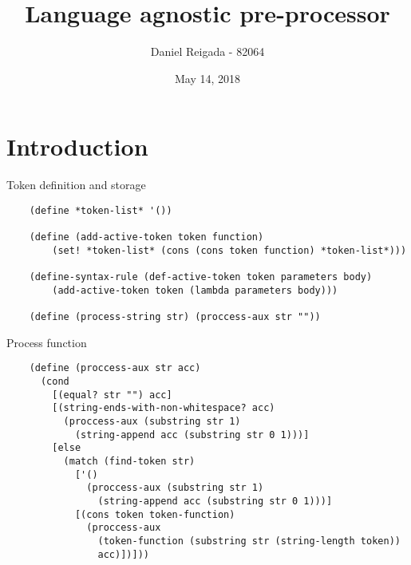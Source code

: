 \documentclass[13pt]{beamer}
\title{Language agnostic pre-processor}
\author{Daniel Reigada - 82064}
\institute{IST - Advanced Programming}
\date{May 14, 2018}
\begin{document}
\begin{frame}
  \titlepage
\end{frame}

\section{Introduction}

\begin{frame}[fragile]{Token definition and storage}
  \begin{verbatim}
    (define *token-list* '())

    (define (add-active-token token function)
        (set! *token-list* (cons (cons token function) *token-list*)))

    (define-syntax-rule (def-active-token token parameters body)
        (add-active-token token (lambda parameters body)))

    (define (process-string str) (proccess-aux str ""))

  \end{verbatim}
\end{frame}

\begin{frame}[fragile]{Process function}
  \begin{verbatim}
    (define (proccess-aux str acc)
      (cond
        [(equal? str "") acc]
        [(string-ends-with-non-whitespace? acc)
          (proccess-aux (substring str 1)
            (string-append acc (substring str 0 1)))]
        [else
          (match (find-token str)
            ['()
              (proccess-aux (substring str 1)
                (string-append acc (substring str 0 1)))] 
            [(cons token token-function)
              (proccess-aux
                (token-function (substring str (string-length token))
                acc)])]))
 \end{verbatim}
\end{frame}
\end{document}
